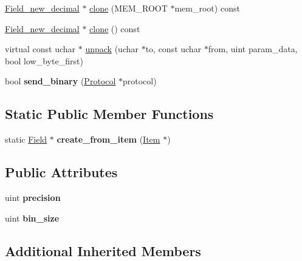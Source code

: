 \begin{DoxyCompactItemize}
\item 
\mbox{\hyperlink{classField__new__decimal}{Field\+\_\+new\+\_\+decimal}} $\ast$ \mbox{\hyperlink{classField__new__decimal_a300e198868ef2e4979f2e7181a3d88e0}{clone}} (M\+E\+M\+\_\+\+R\+O\+OT $\ast$mem\+\_\+root) const
\item 
\mbox{\hyperlink{classField__new__decimal}{Field\+\_\+new\+\_\+decimal}} $\ast$ \mbox{\hyperlink{classField__new__decimal_a77df607cdbd9c275b1e55690b4746255}{clone}} () const
\item 
virtual const uchar $\ast$ \mbox{\hyperlink{classField__new__decimal_a62e2be62b919a9917874a4877fc924d9}{unpack}} (uchar $\ast$to, const uchar $\ast$from, uint param\+\_\+data, bool low\+\_\+byte\+\_\+first)
\item 
\mbox{\label{classField__new__decimal_a3d3195a276eb8fdd0e76a9e9dfd156d5}} 
bool {\bfseries send\+\_\+binary} (\mbox{\hyperlink{classProtocol}{Protocol}} $\ast$protocol)
\end{DoxyCompactItemize}
\subsection*{Static Public Member Functions}
\begin{DoxyCompactItemize}
\item 
\mbox{\label{classField__new__decimal_ae4bfed98e7b3cbdc1ee73e44648c3e84}} 
static \mbox{\hyperlink{classField}{Field}} $\ast$ {\bfseries create\+\_\+from\+\_\+item} (\mbox{\hyperlink{classItem}{Item}} $\ast$)
\end{DoxyCompactItemize}
\subsection*{Public Attributes}
\begin{DoxyCompactItemize}
\item 
\mbox{\label{classField__new__decimal_a07d8b9d3a1cab2b4bbd686b47c5dce6a}} 
uint {\bfseries precision}
\item 
\mbox{\label{classField__new__decimal_a8c37b68e269930ef7a55bcef62fcbdf8}} 
uint {\bfseries bin\+\_\+size}
\end{DoxyCompactItemize}
\subsection*{Additional Inherited Members}


